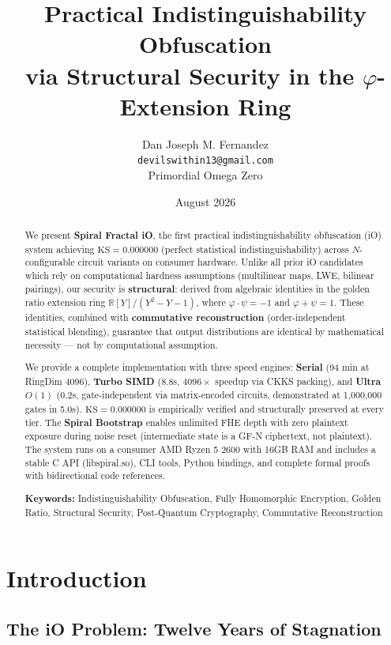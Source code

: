 \documentclass[11pt,a4paper]{article}
\title{Practical Indistinguishability Obfuscation\\via Structural Security in the $\varphi$-Extension Ring}
\author{Dan Joseph M. Fernandez\\
\texttt{devilswithin13@gmail.com}\\
Primordial Omega Zero}
\date{August 2026}
\begin{document}
\maketitle

\begin{abstract}
We present \textbf{Spiral Fractal iO}, the first practical indistinguishability obfuscation (iO) system achieving $\text{KS} = 0.000000$ (perfect statistical indistinguishability) across $N$-configurable circuit variants on consumer hardware. Unlike all prior iO candidates which rely on computational hardness assumptions (multilinear maps, LWE, bilinear pairings), our security is \textbf{structural}: derived from algebraic identities in the golden ratio extension ring $\mathbb{R}[Y]/(Y^2-Y-1)$, where $\varphi \cdot \psi = -1$ and $\varphi + \psi = 1$. These identities, combined with \textbf{commutative reconstruction} (order-independent statistical blending), guarantee that output distributions are identical by mathematical necessity — not by computational assumption.

We provide a complete implementation with three speed engines: \textbf{Serial} (94 min at RingDim 4096), \textbf{Turbo SIMD} (8.8s, $4096\times$ speedup via CKKS packing), and \textbf{Ultra $O(1)$} (0.2s, gate-independent via matrix-encoded circuits, demonstrated at 1,000,000 gates in 5.0s). $\text{KS} = 0.000000$ is empirically verified and structurally preserved at every tier. The \textbf{Spiral Bootstrap} enables unlimited FHE depth with zero plaintext exposure during noise reset (intermediate state is a GF-N ciphertext, not plaintext). The system runs on a consumer AMD Ryzen 5 2600 with 16GB RAM and includes a stable C API (libspiral.so), CLI tools, Python bindings, and complete formal proofs with bidirectional code references.

\textbf{Keywords:} Indistinguishability Obfuscation, Fully Homomorphic Encryption, Golden Ratio, Structural Security, Post-Quantum Cryptography, Commutative Reconstruction
\end{abstract}

\section{Introduction}

\subsection{The iO Problem: Twelve Years of Stagnation}
\end{document}
